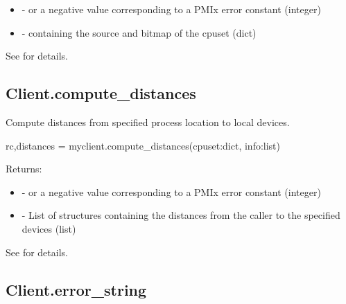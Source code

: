 \begin{itemize}
    \item {} -  or a negative value corresponding to a PMIx error constant (integer)
    \item {} -  containing the source and bitmap of the cpuset (dict)
\end{itemize}

See  for details.


\subsection{Client.compute_distances}

\summary
Compute distances from specified process location to local devices.

\format

\pyspecificstart
\begin{codepar}
rc,distances = myclient.compute_distances(cpuset:dict, info:list)
\end{codepar}
\pyspecificend

\begin{arglist}
\end{arglist}


Returns:

\begin{itemize}
    \item {} -  or a negative value corresponding to a PMIx error constant (integer)
    \item {} - List of  structures containing the distances from the caller to the specified devices (list)
\end{itemize}

See  for details.



\subsection{Client.error_string}

